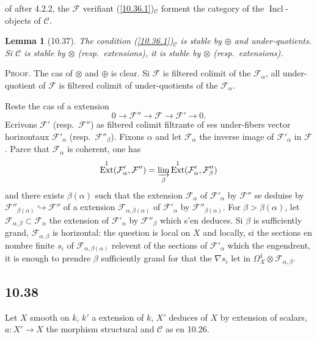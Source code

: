 \documentclass[12pt,a4paper]{article}
\theoremstyle{plain}
\newtheorem{lemma}[theorem]{Lemma}
\theoremstyle{definition}
\theoremstyle{remark}
\DeclareMathOperator{\Ext}{Ext}
\DeclareMathOperator{\Incl}{Incl}
\begin{document}
of after 4.2.2, the $\mathcal{F}$ verifiant (\ref{10.36.1})$_{\mathcal{C}}$ forment the category of the $\Incl$-objects of $\mathcal{C}$.

\begin{lemma}[10.37]
The condition (\ref{10.36.1})$_{\mathcal{C}}$ is stable by $\oplus$ and under-quotients. Si $\mathcal{C}$ is stable by $\otimes$ (resp.~extensions), it is stable by $\otimes$ (resp.~extensions).
\end{lemma}

\textsc{Proof.} The cas of $\otimes$ and $\oplus$ is clear. Si $\mathcal{F}$ is filtered colimit of the $\mathcal{F}_\alpha$, all under-quotient of $\mathcal{F}$ is filtered colimit of under-quotients of the $\mathcal{F}_\alpha$.

Reste the cas of a extension
$$0 \longrightarrow \mathcal{F}'' \longrightarrow \mathcal{F} \longrightarrow \mathcal{F}' \longrightarrow 0.$$
Ecrivons $\mathcal{F}'$ (resp.~$\mathcal{F}''$) as filtered colimit filtrante of ses under-fibers vector horizontaux $\mathcal{F}'_\alpha$ (resp.~$\mathcal{F}''_\beta$). Fixons $\alpha$ and let $\mathcal{F}_\alpha$ the inverse image of $\mathcal{F}'_\alpha$ in $\mathcal{F}$. Parce that $\mathcal{F}_\alpha$ is coherent, one has
$$\Ext^1(\mathcal{F}'_\alpha, \mathcal{F}'') = \varinjlim_\beta \Ext^1(\mathcal{F}'_\alpha, \mathcal{F}''_\beta)$$
and there exists $\beta(\alpha)$ such that the extension $\mathcal{F}_\alpha$ of $\mathcal{F}'_\alpha$ by $\mathcal{F}''$ se deduise by $\mathcal{F}''_{\beta(\alpha)} \hookrightarrow \mathcal{F}''$ of a extension $\mathcal{F}_{\alpha, \beta(\alpha)}$ of $\mathcal{F}'_\alpha$ by $\mathcal{F}''_{\beta(\alpha)}$. For $\beta > \beta(\alpha)$, let $\mathcal{F}_{\alpha, \beta} \subset \mathcal{F}_\alpha$ the extension of $\mathcal{F}'_\alpha$ by $\mathcal{F}''_\beta$ which s'en deduces. Si $\beta$ is sufficiently grand, $\mathcal{F}_{\alpha, \beta}$ is horizontal: the question is local on $X$ and locally, si the sections en nombre finite $s_i$ of $\mathcal{F}_{\alpha, \beta(\alpha)}$ relevent of the sections of $\mathcal{F}'_\alpha$ which the engendrent, it is enough to prendre $\beta$ sufficiently grand for that the $\nabla s_i$ let in $\Omega^1_X \otimes \mathcal{F}_{\alpha, \beta}$.

\subsection*{10.38}

Let $X$ smooth on $k$, $k'$ a extension of $k$, $X'$ deduces of $X$ by extension of scalars, $a: X' \to X$ the morphism structural and $\mathcal{C}$ as en 10.26.
\end{document}

